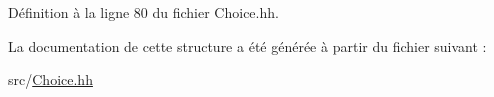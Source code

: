 Définition à la ligne 80 du fichier Choice.hh.



La documentation de cette structure a été générée à partir du fichier suivant :\begin{DoxyCompactItemize}
\item 
src/\hyperlink{_choice_8hh}{Choice.hh}\end{DoxyCompactItemize}
